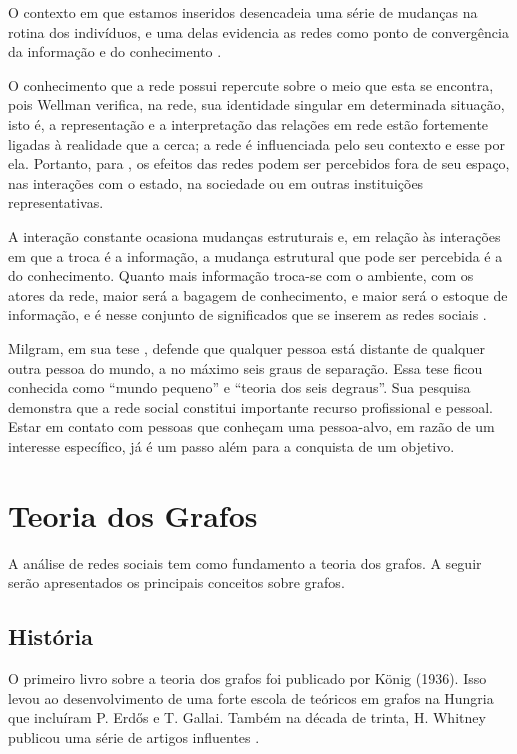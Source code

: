 O contexto em que estamos inseridos desencadeia uma série de mudanças na rotina dos indivíduos, e uma delas evidencia as redes como ponto de convergência da informação e do conhecimento \cite{Tomae:Alcara:Chiara:2005}.

O conhecimento que a rede possui repercute sobre o meio que esta se encontra, pois Wellman \cite{Wellman:1996} verifica, na rede, sua identidade singular em determinada situação, isto é, a representação e a interpretação das relações em rede estão fortemente ligadas à realidade que a cerca; a rede é influenciada pelo seu contexto e esse por ela. Portanto, para \cite{Marteleto:2001}, os efeitos das redes podem ser percebidos fora de seu espaço, nas interações com o estado, na sociedade ou em outras instituições representativas.

A interação constante ocasiona mudanças estruturais e, em relação às interações em que a troca é a informação, a mudança estrutural que pode ser percebida é a do conhecimento. Quanto mais informação troca-se com o ambiente, com os atores da rede, maior será a bagagem de conhecimento, e maior será o estoque de informação, e é nesse conjunto de significados que se inserem as redes sociais \cite{Tomae:Alcara:Chiara:2005}.

Milgram, em sua tese \cite{Milgram:1967}, defende que qualquer pessoa está distante de qualquer outra pessoa do mundo, a no máximo seis graus de separação. Essa tese ficou conhecida como ``mundo pequeno'' e ``teoria dos seis degraus''. Sua pesquisa demonstra que a rede social constitui importante recurso profissional e pessoal. Estar em contato com pessoas que conheçam uma pessoa-alvo, em razão de um interesse específico, já é um passo além para a conquista de um objetivo.

\section{Teoria dos Grafos}

A análise de redes sociais tem como fundamento a teoria dos grafos. A seguir serão apresentados os principais conceitos sobre grafos.

\subsection{História}

O primeiro livro sobre a teoria dos grafos foi publicado por König (1936). Isso levou ao desenvolvimento de uma forte escola de teóricos em grafos na Hungria que incluíram P. Erdős e T. Gallai. Também na década de trinta, H. Whitney publicou uma série de artigos influentes \cite{Bondy:2007}.

